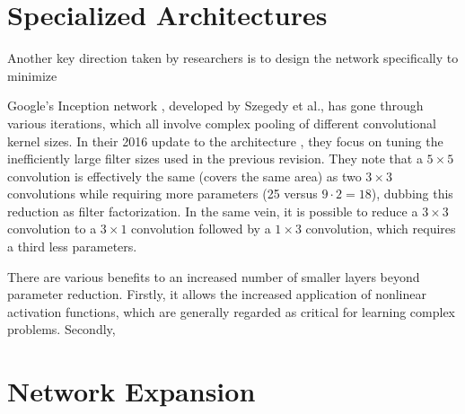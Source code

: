 \section{Specialized Architectures}
Another key direction taken by researchers is to design the network specifically to minimize 

Google's Inception network \cite{szegedy2015going}, developed by Szegedy et al., has gone through various iterations, which all involve complex pooling of different convolutional kernel sizes.
In their 2016 update to the architecture \cite{szegedy2016rethinking}, they focus on tuning the inefficiently large filter sizes used in the previous revision.
They note that a $5\times 5$ convolution is effectively the same (covers the same area) as two $3\times 3$ convolutions while requiring more parameters (25 versus $9 \cdot 2 = 18$), dubbing this reduction as filter factorization.
In the same vein, it is possible to reduce a $3\times 3$ convolution to a $3\times 1$ convolution followed by a $1\times 3$ convolution, which requires a third less parameters.

There are various benefits to an increased number of smaller layers beyond parameter reduction.
Firstly, it allows the increased application of nonlinear activation functions, which are generally regarded as critical for learning complex problems.
Secondly, 


\section{Network Expansion}
